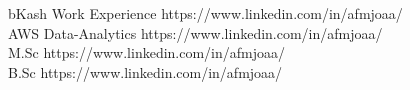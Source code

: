 
\horizontalLineLeft

\certificateItem
    {bKash Work Experience}
    {https://www.linkedin.com/in/afmjoaa/} \\
\certificateItem
    {AWS Data-Analytics}
    {https://www.linkedin.com/in/afmjoaa/} \\
\certificateItem
    {M.Sc}
    {https://www.linkedin.com/in/afmjoaa/} \\
\certificateItem
    {B.Sc}
    {https://www.linkedin.com/in/afmjoaa/}
